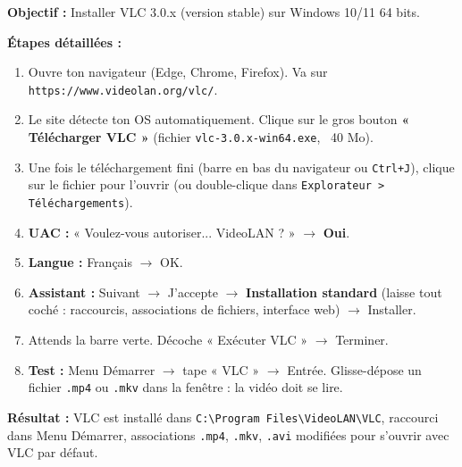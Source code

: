 \documentclass[11pt]{article}
\begin{document}
\begin{exemplebox}
\textbf{Objectif :} Installer VLC 3.0.x (version stable) sur Windows 10/11 64 bits.

\textbf{Étapes détaillées :}
\begin{enumerate}
    \item Ouvre ton navigateur (Edge, Chrome, Firefox). Va sur \texttt{https://www.videolan.org/vlc/}.
    \item Le site détecte ton OS automatiquement. Clique sur le gros bouton \textbf{« Télécharger VLC »} (fichier \texttt{vlc-3.0.x-win64.exe}, ~40 Mo).
    \item Une fois le téléchargement fini (barre en bas du navigateur ou \texttt{Ctrl+J}), clique sur le fichier pour l'ouvrir (ou double-clique dans \texttt{Explorateur > Téléchargements}).
    \item \textbf{UAC :} « Voulez-vous autoriser... VideoLAN ? » $\to$ \textbf{Oui}.
    \item \textbf{Langue :} Français $\to$ OK.
    \item \textbf{Assistant :} Suivant $\to$ J'accepte $\to$ \textbf{Installation standard} (laisse tout coché : raccourcis, associations de fichiers, interface web) $\to$ Installer.
    \item Attends la barre verte. Décoche « Exécuter VLC » $\to$ Terminer.
    \item \textbf{Test :} Menu Démarrer $\to$ tape « VLC » $\to$ Entrée. Glisse-dépose un fichier \texttt{.mp4} ou \texttt{.mkv} dans la fenêtre : la vidéo doit se lire.
\end{enumerate}
\textbf{Résultat :} VLC est installé dans \texttt{C:\textbackslash Program Files\textbackslash VideoLAN\textbackslash VLC}, raccourci dans Menu Démarrer, associations \texttt{.mp4}, \texttt{.mkv}, \texttt{.avi} modifiées pour s'ouvrir avec VLC par défaut.
\end{exemplebox}
\end{document}
